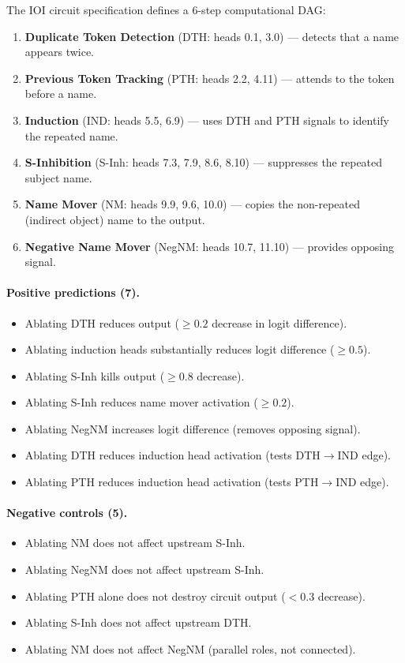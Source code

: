 \documentclass[10pt]{article}
\begin{document}
The IOI circuit specification defines a 6-step computational DAG:

\begin{enumerate}[nosep]
    \item \textbf{Duplicate Token Detection} (DTH: heads 0.1, 3.0) --- detects that a name appears twice.
    \item \textbf{Previous Token Tracking} (PTH: heads 2.2, 4.11) --- attends to the token before a name.
    \item \textbf{Induction} (IND: heads 5.5, 6.9) --- uses DTH and PTH signals to identify the repeated name.
    \item \textbf{S-Inhibition} (S-Inh: heads 7.3, 7.9, 8.6, 8.10) --- suppresses the repeated subject name.
    \item \textbf{Name Mover} (NM: heads 9.9, 9.6, 10.0) --- copies the non-repeated (indirect object) name to the output.
    \item \textbf{Negative Name Mover} (NegNM: heads 10.7, 11.10) --- provides opposing signal.
\end{enumerate}

\paragraph{Positive predictions (7).}
\begin{itemize}[nosep]
    \item Ablating DTH reduces output ($\geq 0.2$ decrease in logit difference).
    \item Ablating induction heads substantially reduces logit difference ($\geq 0.5$).
    \item Ablating S-Inh kills output ($\geq 0.8$ decrease).
    \item Ablating S-Inh reduces name mover activation ($\geq 0.2$).
    \item Ablating NegNM increases logit difference (removes opposing signal).
    \item Ablating DTH reduces induction head activation (tests DTH$\rightarrow$IND edge).
    \item Ablating PTH reduces induction head activation (tests PTH$\rightarrow$IND edge).
\end{itemize}

\paragraph{Negative controls (5).}
\begin{itemize}[nosep]
    \item Ablating NM does not affect upstream S-Inh.
    \item Ablating NegNM does not affect upstream S-Inh.
    \item Ablating PTH alone does not destroy circuit output ($< 0.3$ decrease).
    \item Ablating S-Inh does not affect upstream DTH.
    \item Ablating NM does not affect NegNM (parallel roles, not connected).
\end{itemize}
\end{document}
